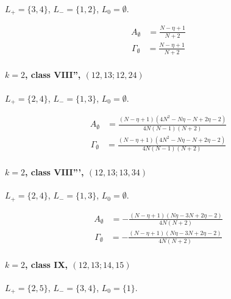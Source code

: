 \documentclass[11pt]{article}
\begin{document}
$L_+=\{3,4\}$, $L_-=\{1,2\}$, $L_0=\emptyset$.

\begin{align*}
  A_{\emptyset} &= \frac{N - \eta + 1}{N + 2} 
\end{align*}
\begin{align*}
  \Gamma_{\emptyset} &= \frac{N - \eta + 1}{N + 2} 
\end{align*}

\paragraph{$k=2$, class VIII'', $(12,13;12,24)$}

$L_+=\{2,4\}$, $L_-=\{1,3\}$, $L_0=\emptyset$.

\begin{align*}
  A_{\emptyset} &= \frac{\left(N - \eta + 1\right) \left(4 N^{2} - N \eta - N + 2 \eta - 2\right)}{4 N \left(N - 1\right) \left(N + 2\right)} 
\end{align*}
\begin{align*}
  \Gamma_{\emptyset} &= \frac{\left(N - \eta + 1\right) \left(4 N^{2} - N \eta - N + 2 \eta - 2\right)}{4 N \left(N - 1\right) \left(N + 2\right)} 
\end{align*}

\paragraph{$k=2$, class VIII''', $(12,13;13,34)$}

$L_+=\{2,4\}$, $L_-=\{1,3\}$, $L_0=\emptyset$.

\begin{align*}
  A_{\emptyset} &= - \frac{\left(N - \eta + 1\right) \left(N \eta - 3 N + 2 \eta - 2\right)}{4 N \left(N + 2\right)} 
\end{align*}
\begin{align*}
  \Gamma_{\emptyset} &= - \frac{\left(N - \eta + 1\right) \left(N \eta - 3 N + 2 \eta - 2\right)}{4 N \left(N + 2\right)} 
\end{align*}

\paragraph{$k=2$, class IX, $(12,13;14,15)$}

$L_+=\{2,5\}$, $L_-=\{3,4\}$, $L_0=\{1\}$.
\end{document}
